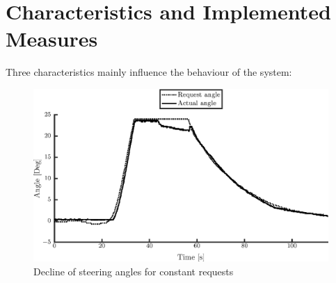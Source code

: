\documentclass[root.tex]{subfiles}
\begin{document}
	
	{\pagestyle{empty}}
	\section{Characteristics and Implemented Measures}
	\label{chap:Delays}
	
	Three characteristics mainly influence the behaviour of the system: 
	
	\begin{figure}[!h]
		
		\includegraphics[width=1\linewidth]{front}
		\caption[Decline of steering angles for constant requests]{Decline of steering angles for constant requests}
		
		\label{fig:Constant_request}
	\end{figure}
	
\end{document}
